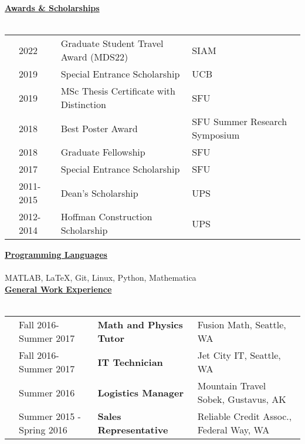 \documentclass[letterpaper,11pt,oneside]{article}
\newcommand{\headr}[1]{\vspace{10pt}\uline{\Large{\textbf{#1}} \hfill } \\ \vspace{-10pt}\\}
\begin{document}
\headr{Awards \& Scholarships}

\begin{tabular}{@{} p{0.01cm} p{2cm} p{9cm} p{8cm}}
& 2022 & Graduate Student Travel Award (MDS22) & SIAM \\
& 2019 & Special Entrance Scholarship & UCB \\
& 2019 & MSc Thesis Certificate with Distinction & SFU \\
& 2018 & Best Poster Award & SFU Summer Research Symposium \\
& 2018 & Graduate Fellowship & SFU \\
& 2017 & Special Entrance Scholarship & SFU \\
&2011-2015 & Dean’s Scholarship & UPS\\
&2012-2014 & Hoffman Construction Scholarship & UPS\\ 
\end{tabular}

\headr{Programming Languages}

MATLAB, \LaTeX, Git, Linux, Python, Mathematica\\

\headr{General Work Experience}

\begin{tabular}{@{} p{0.5cm} p{4.5cm} p{5cm} p{12cm}}
& Fall 2016-Summer 2017 & \textbf{Math and Physics Tutor} & Fusion Math, Seattle, WA\\
& Fall 2016-Summer 2017 & \textbf{IT Technician} & Jet City IT, Seattle, WA\\
& Summer 2016 & \textbf{Logistics Manager} & Mountain Travel Sobek, Gustavus, AK\\
& Summer 2015 - Spring 2016 & \textbf{Sales Representative} & Reliable Credit Assoc., Federal Way, WA\\
\end{tabular}

\end{document}
